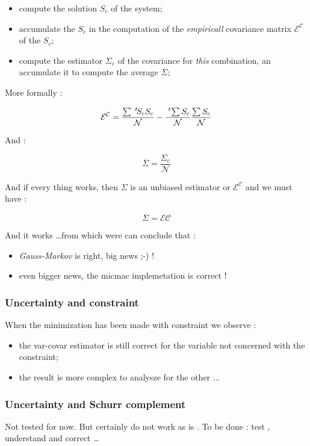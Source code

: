 \begin{itemize}
     \item compute the solution $S_c$  of the system;

     \item accumulate the $S_c$ in the computation of the \emph{empiricall} covariance matrix $\mathcal{E^C}$ of the $S_c$;

     \item compute the estimator $\Sigma_c $ of the covariance for \emph{this} combination, an accumulate it
	     to compute the average  $\overline \Sigma$;
\end{itemize}

More formally :

\begin{equation}
	\mathcal{E^C} =  \frac{\sum \; ^{t} \! S_c S_c }{\mathcal{N}} -   \frac{\; ^{t} \! \sum S_c}{\mathcal{N}}  \frac{\sum S_c}{\mathcal{N}}
\end{equation}

And  :

\begin{equation}
	\overline \Sigma =  \frac{\Sigma_c }{\mathcal{N}} 
\end{equation}


And if every thing works, then $ \Sigma$ is an unbiased estimator or $ \mathcal{E^C} $ and we must have :

\begin{equation}
	\overline \Sigma   = \mathcal{EC}
\end{equation}

And it works \dots from which were can conclude that :

\begin{itemize}
     \item \emph{Gauss-Markov} is right, big news ;-) !
    \item even bigger news, the micmac implemetation is correct !
\end{itemize}

\subsubsection{Uncertainty and constraint}

When the minimization has been made with  constraint we observe :

\begin{itemize}
   \item  the var-covar estimator is still correct  for the variable not concerned with the constraint;
   \item  the result is more complex to analysze for the other ... 
\end{itemize}


\subsubsection{Uncertainty and Schurr complement}

Not tested for now. But certainly do not work as is . To be done : test , understand and correct \dots






